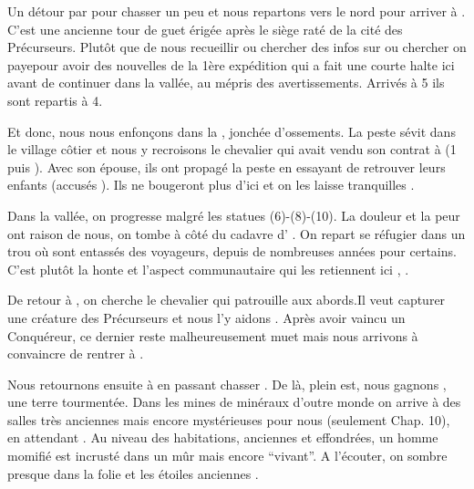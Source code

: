 \documentclass[11pt]{article}
\begin{document}
Un détour par \sousmuraille{} pour chasser un peu et nous repartons vers le nord pour arriver à \longcairn{} . C'est une ancienne tour de guet érigée après le siège raté de \tuathan{} la cité des Précurseurs. Plutôt que de nous recueillir ou chercher des infos sur \tuathan{} ou chercher \agravain{} on payepour avoir des nouvelles de la 1ère expédition  qui a fait une courte halte ici avant de continuer dans la vallée, au mépris des avertissements. Arrivés à 5 ils sont repartis à 4.

Et donc, nous nous enfonçons dans la \valleegardiens{}, jonchée d'ossements. La peste sévit dans le village côtier et nous y recroisons le chevalier qui avait vendu son contrat à \beor{} (1 puis ). Avec son épouse, ils ont propagé la peste en essayant de retrouver leurs enfants (accusés ). Ils ne bougeront plus d'ici et on les laisse tranquilles .

Dans la vallée, on progresse malgré les statues (6)-(8)-(10). La douleur et la peur ont raison de nous, on tombe à côté du cadavre d'\aubert{} . On repart se réfugier dans un trou  où sont entassés des voyageurs, depuis de nombreuses années pour certains. C'est plutôt la honte et l'aspect communautaire qui les retiennent ici , .

De retour à \longcairn{}, on cherche le chevalier \agravain{} qui patrouille aux abords.Il veut capturer une créature des Précurseurs et nous l'y aidons . Après avoir vaincu un Conquéreur, ce dernier reste malheureusement muet mais nous arrivons à convaincre \agravain{} de rentrer à \camelot{} . 


Nous retournons ensuite à \loincomtat{} en passant chasser \sousmuraille{}.  De là, plein est, nous gagnons \devastation{} , une terre tourmentée. Dans les mines de minéraux d'outre monde on arrive à des salles très anciennes mais encore mystérieuses pour nous (seulement Chap. 10), en attendant . Au niveau des habitations, anciennes et effondrées, un homme momifié est incrusté dans un mûr mais encore ``vivant''. A l'écouter, on sombre presque dans la folie et les étoiles anciennes .
\end{document}
